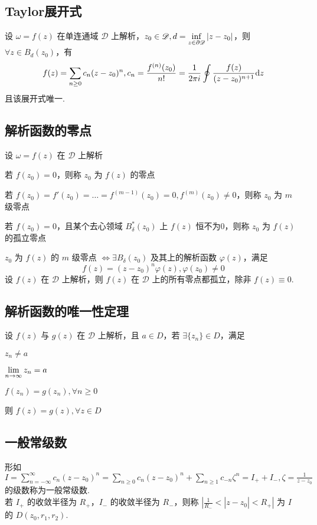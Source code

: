 \documentclass[./main.tex]{subfiles}
\begin{document}
\subsection{Taylor展开式}
设 $\omega=f(z)$ 在单连通域 $\mathscr{D}$ 上解析，$z_0\in\mathscr{D},d=\mathop{\inf}\limits_{z\in\partial\mathscr{D}}|z-z_0|$，则 $\forall z\in B_d(z_0)$，有
\begin{equation}
    f(z)=\sum_{n\ge 0}c_n(z-z_0)^n,c_n=\frac{f^{(n)}(z_0)}{n!}=\frac{1}{2\pi i}\oint\frac{f(z)}{(z-z_0)^{n+1}}\text{d}z
\end{equation}
且该展开式唯一. 
\subsection{解析函数的零点}
设 $\omega=f(z)$ 在 $\mathscr{D}$ 上解析
\begin{enumerate*}
    \item 若 $f(z_0)=0$，则称 $z_0$ 为 $f(z)$ 的零点
    \item 若 $f(z_0)=f'(z_0)=\dots=f^{(m-1)}(z_0)=0,f^{(m)}(z_0)\neq 0$，则称 $z_0$ 为 $m$ 级零点
    \item 若 $f(z_0)=0$，且某个去心领域 $B^*_{\delta}(z_0)$ 上 $f(z)$ 恒不为0，则称 $z_0$ 为 $f(z)$ 的孤立零点
\end{enumerate*}
$z_0$ 为 $f(z)$ 的 $m$ 级零点 $\iff\exists B_{\delta}(z_0)$ 及其上的解析函数 $\varphi(z)$，满足 $$f(z)=(z-z_0)^n\varphi(z),\varphi(z_0)\neq 0$$
设 $f(z)$ 在 $\mathscr{D}$ 上解析，则 $f(z)$ 在 $\mathscr{D}$ 上的所有零点都孤立，除非 $f(z)\equiv 0$. 
\subsection{解析函数的唯一性定理}
设 $f(z)$ 与 $g(z)$ 在 $\mathscr{D}$ 上解析，且 $a\in D$，若 $\exists\{z_n\}\in D$，满足
\begin{enumerate*}
    \item $z_n\neq a$
    \item $\lim\limits_{n\rightarrow\infty}z_n=a$
    \item $f(z_n)=g(z_n),\forall n\ge 0$
\end{enumerate*}
则 $f(z)=g(z),\forall z\in D$
\subsection{一般常级数}
形如 $I=\sum_{n=-\infty}^{\infty}c_n(z-z_0)^n=\sum_{n\ge 0}c_n(z-z_0)^n+\sum_{n\ge 1}c_{-n}\zeta^n=I_++I_-,\zeta=\frac{1}{z-z_0}$ 的级数称为一般常级数. \\
\indent 若 $I_+$ 的收敛半径为 $R_+$，$I_-$ 的收敛半径为 $R_-$，则称 $|\frac{1}{R_-}<|z-z_0|<R_+|$ 为 $I$ 的 $D(z_0,r_1,r_2)$. 
\end{document}
